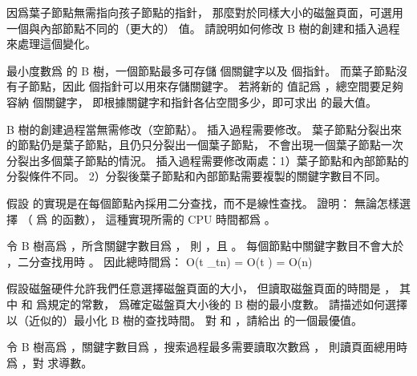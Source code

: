 \startEXERCISE
因爲葉子節點無需指向孩子節點的指針，
那麼對於同樣大小的磁盤頁面，可選用一個與內部節點不同的（更大的）  值。
請說明如何修改 B 樹的創建和插入過程來處理這個變化。
\stopEXERCISE

\startANSWER
最小度數爲  的 B 樹，一個節點最多可存儲  個關鍵字以及  個指針。
而葉子節點沒有子節點，因此  個指針可以用來存儲關鍵字。
若將新的  值記爲 ，總空間要足夠容納  個關鍵字，
即根據關鍵字和指針各佔空間多少，即可求出  的最大值。

B 樹的創建過程當無需修改（空節點）。
插入過程需要修改。
葉子節點分裂出來的節點仍是葉子節點，且仍只分裂出一個葉子節點，
不會出現一個葉子節點一次分裂出多個葉子節點的情況。
插入過程需要修改兩處：1）葉子節點和內部節點的分裂條件不同。
2）分裂後葉子節點和內部節點需要複製的關鍵字數目不同。
\stopANSWER

\startEXERCISE
假設  的實現是在每個節點內採用二分查找，而不是線性查找。
證明：
無論怎樣選擇  （ 爲  的函數），
這種實現所需的 CPU 時間都爲 。
\stopEXERCISE

\startANSWER
令 B 樹高爲 ，所含關鍵字數目爲 ，
則 ，且 。
每個節點中關鍵字數目不會大於 ，二分查找用時 。
因此總時間爲：
\startformula
O(\lg t \times \log_{t}n) = O(\lg t \times {}) = O(\lg n)
\stopformula
\stopANSWER

\startEXERCISE
假設磁盤硬件允許我們任意選擇磁盤頁面的大小，
但讀取磁盤頁面的時間是 ，
其中  和  爲規定的常數，  爲確定磁盤頁大小後的 B 樹的最小度數。
請描述如何選擇  以（近似的）最小化 B 樹的查找時間。
對  和 ，請給出  的一個最優值。
\stopEXERCISE

\startANSWER
令 B 樹高爲 ，關鍵字數目爲 ，搜索過程最多需要讀取次數爲 ，
則讀頁面總用時爲 ，對  求導數。
\stopANSWER

\stopsection

